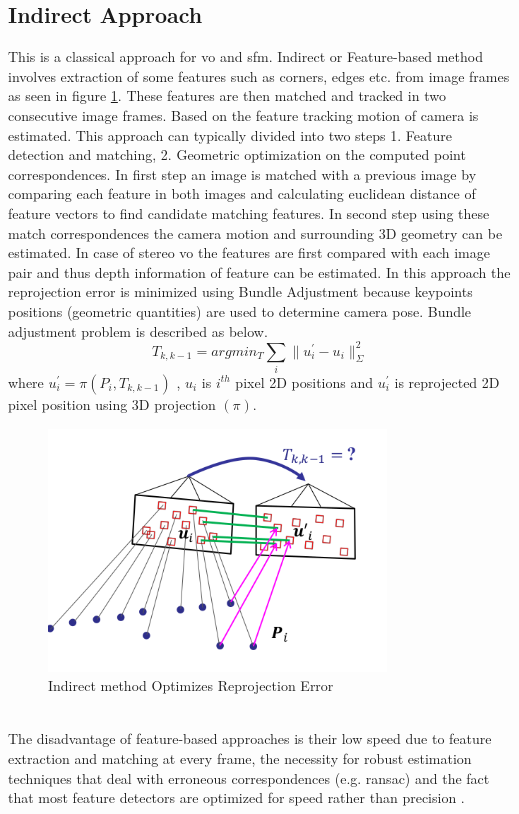 \subsection{Indirect Approach}
This is a classical approach for \acrshort{vo} and \acrshort{sfm}. Indirect or Feature-based method involves extraction of some features such as corners, edges etc. from image frames as seen in figure \ref{fig:feature}. These features are then matched and tracked in two consecutive image frames. Based on the feature tracking motion of camera is estimated. This approach can typically divided into two steps 1. Feature detection and matching, 2. Geometric optimization on the computed point correspondences. In first step an image is matched with a previous image by comparing each feature in both images and calculating euclidean distance of feature vectors to find candidate matching features\cite{Aqel-et-al-2016}. In second step using these match correspondences the camera motion and surrounding 3D geometry can be estimated. In case of stereo \acrshort{vo} the features are first compared with each image pair and thus depth information of feature can be estimated. In this approach the reprojection error is minimized using Bundle Adjustment because keypoints positions (geometric quantities) are used to determine camera pose. Bundle adjustment problem is described as below. 
\begin{equation*}
	T_{k,k-1} = arg min_{T} \sum_{i} \| u^{'}_{i}- u_{i}\|^{2}_{\Sigma}
\end{equation*}
where   $u^{'}_{i} = \pi (P_{i},T_{k,k-1})$ , $ u_{i} $ is $ i^{th} $  pixel 2D positions and $ u^{'}_{i} $ is reprojected 2D pixel position using 3D projection $(\pi)$.  
\newline
\begin{figure}[h]
	\centering
	\includegraphics[width=0.8\textwidth]{indirect}
	\caption{Indirect method Optimizes Reprojection Error \cite{lecture}}
	\label{fig:feature}
\end{figure}
\\
The disadvantage of feature-based approaches is their low speed due to feature extraction and matching at every frame, the necessity for robust estimation techniques that deal with erroneous correspondences (e.g. \acrshort{ransac}) and the fact that most feature detectors are optimized for speed rather than precision \cite{7782863}.

